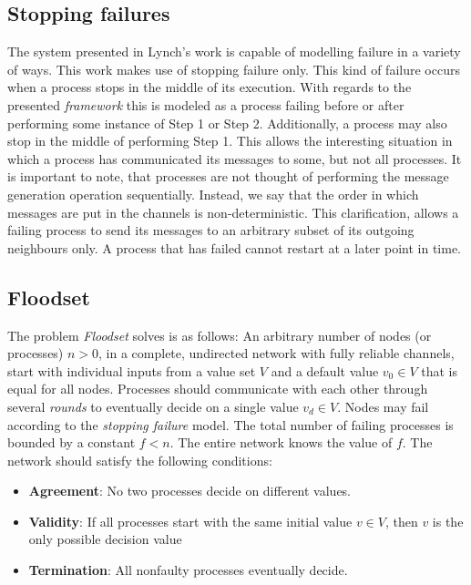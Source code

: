 \documentclass[fleqn]{article}
\begin{document}
\subsection{Stopping failures}
The system presented in Lynch's work \cite{refNancy} is capable of modelling failure in a variety of ways.
This work makes use of stopping failure only. This kind of failure occurs when a process stops in the middle of its execution. With regards to the presented \textit{framework} this
is modeled as a process failing before or after performing some instance of Step 1 or Step 2. Additionally, a process may also stop in the middle of performing Step 1. This allows
the interesting situation in which a process has communicated its messages to some, but not all processes. It is important to note, that processes are not thought of performing
the message generation operation sequentially. Instead, we say that the order in which messages are put in the channels is non-deterministic. This clarification, allows a failing process
to send its messages to an arbitrary subset of its outgoing neighbours only. A process that has failed cannot restart at a later point in time.


\subsection{Floodset}
The problem \textit{Floodset} solves is as follows: An arbitrary number of nodes (or processes) $n > 0$, in a complete, undirected network with fully reliable channels, start with individual inputs from a value set $V$ and a default value $v_0 \in V$ that is equal for all nodes. Processes should communicate with each other through several \textit{rounds} to eventually decide on a single value $v_d \in V$. Nodes may fail according to the \textit{stopping failure} model. The total number of failing processes is bounded by a constant $f < n$. The entire network knows the value of $f$.  The network should satisfy the following conditions:

\begin{itemize}
  \item \textbf{Agreement}: No two processes decide on different values.
  \item \textbf{Validity}: If all processes start with the same initial value $v \in V$, then $v$ is the only possible decision value
  \item \textbf{Termination}: All nonfaulty processes eventually decide.
\end{itemize}
\end{document}
